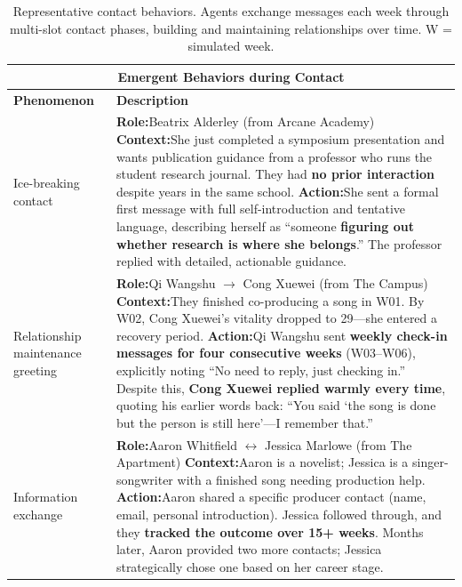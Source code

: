   \begin{table}[t]
  \centering
  \small
  \caption{Representative contact behaviors. Agents exchange messages each week through multi-slot contact phases, building and maintaining relationships over time. W = simulated week.}
  \label{tab:contact}
  \begin{tabular}{p{0.8in}p{4.3in}}
  \toprule
  \multicolumn{2}{c}{\textbf{Emergent Behaviors during Contact}} \\
  \midrule
  \textbf{Phenomenon} & \textbf{Description} \\
  \midrule
  
  Ice-breaking \newline contact
  &
  \textbf{Role:}\quad Beatrix Alderley \hfill (from Arcane Academy) \newline
  \textbf{Context:}\quad She just completed a symposium presentation and wants publication guidance from a professor who runs the student research journal. They had \textbf{no prior interaction} despite years in the same school. \newline
  \textbf{Action:}\quad She sent a formal first message with full self-introduction and tentative language, describing herself as ``someone \textbf{figuring out whether research is where she belongs}.'' The professor replied with detailed, actionable guidance.
  \\
  \midrule
  
  Relationship \newline maintenance \newline greeting
  &
  \textbf{Role:}\quad Qi Wangshu $\to$ Cong Xuewei \hfill (from The Campus) \newline
  \textbf{Context:}\quad They finished co-producing a song in W01. By W02, Cong Xuewei's vitality dropped to 29---she entered a recovery period. \newline
  \textbf{Action:}\quad Qi Wangshu sent \textbf{weekly check-in messages for four consecutive weeks} (W03--W06), explicitly noting ``No need to reply, just checking in.'' Despite this, \textbf{Cong Xuewei replied warmly every time}, quoting his earlier words back: ``You said `the song is done but the person is still here'---I remember that.''
  \\
  \midrule
  
  Information \newline exchange
  &
  \textbf{Role:}\quad Aaron Whitfield $\leftrightarrow$ Jessica Marlowe \hfill (from The Apartment) \newline
  \textbf{Context:}\quad Aaron is a novelist; Jessica is a singer-songwriter with a finished song needing production help. \newline
  \textbf{Action:}\quad Aaron shared a specific producer contact (name, email, personal introduction). Jessica followed through, and they \textbf{tracked the outcome over 15+ weeks}. Months later, Aaron provided two more contacts; Jessica strategically chose one based on her career stage.
  \\
  \midrule
  

\end{tabular}
\end{table}
